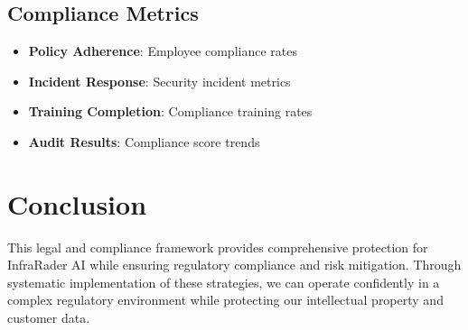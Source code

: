 \documentclass[business]{../templates/infraradar-main}
\begin{document}
\subsection{Compliance Metrics}
\begin{itemize}
    \item \textbf{Policy Adherence}: Employee compliance rates
    \item \textbf{Incident Response}: Security incident metrics
    \item \textbf{Training Completion}: Compliance training rates
    \item \textbf{Audit Results}: Compliance score trends
\end{itemize}

\section{Conclusion}

This legal and compliance framework provides comprehensive protection for InfraRader AI while ensuring regulatory compliance and risk mitigation. Through systematic implementation of these strategies, we can operate confidently in a complex regulatory environment while protecting our intellectual property and customer data.
\end{document}
